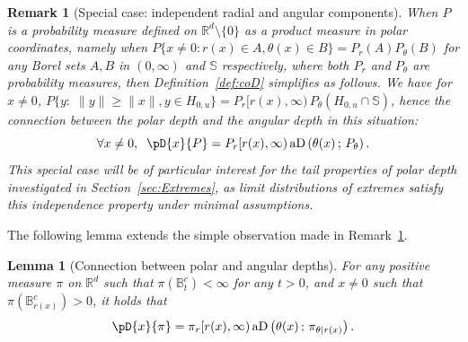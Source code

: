 \documentclass{article}
\numberwithin{equation}{section}
\newtheorem{lemma}{Lemma}[section]
\newtheorem{remark}{Remark}[section]
\newcommand{\rset}{\mathbb{R}}
\newcommand{\sphere}{\mathbb{S}}
\newcommand{\ball}{\mathbb{B}}
\newcommand{\AHS}[1]{H_{0, {#1}} }
\newcommand{\coD}[2]{\pD{#1}{#2}}
\newcommand{\aD}[2]{{\mathrm{aD}}\left({#1}\,;\,{#2}\right)}
\begin{document}
\begin{remark}[Special case: independent radial and angular
    components]\label{rem:special-independent}
    When $P$  is  a probability measure defined on $\rset^d\setminus\{0\}$  as a product measure in polar  coordinates,
    namely when $P\{x\neq 0: r(x) \in A, \theta(x)\in B \} = P_r(A)
    P_\theta(B)$ for any Borel sets $A,B$ in $(0,\infty)$ and $\sphere$ respectively, where both $P_r$ and $P_\theta$ are probability measures, %
    then  Definition~\ref{def:coD} simplifies as follows. %
    We have for $x\neq 0$, $P\{y:\;  \|y\| \ge\|x\|, y \in \AHS{u}\} = P_r
    [r(x),\infty)\,P_\theta(\AHS{u}\cap \sphere)$, hence the connection
    between the polar depth and the angular depth in this situation:
    \begin{equation}\label{eq:center-out-angular-independentCase}
       \forall x\neq 0,\;\;      \coD{x}{P} =  P_r[r(x),\infty)\,\aD{\theta(x)}{P_\theta}.
    \end{equation}
    This special case will be of particular interest for the tail
    properties of polar depth investigated in
    Section~\ref{sec:Extremes}, as limit distributions of extremes
    satisfy this independence property under minimal assumptions.
  \end{remark}



  
  
The following lemma extends the simple observation made in
Remark~\ref{rem:special-independent}. 
\begin{lemma}[Connection between polar and angular depths]\label{lem:connect-aD-coD}
  For any positive  measure $\pi$ on $\rset^d$ such that $\pi(\ball_t^c)<\infty$ for any $t>0$, and $x\neq 0$ such that
  $\pi(\ball_{r(x)}^c) >0$, it holds that
    \begin{equation}
        \label{eq:equiv-coD-aD}
    \coD{x}{\pi} = \pi_r[r(x),\infty)\, \aD{\theta(x)}{\pi_{\theta|r(x)}}.
  \end{equation}
\end{lemma}
\end{document}
